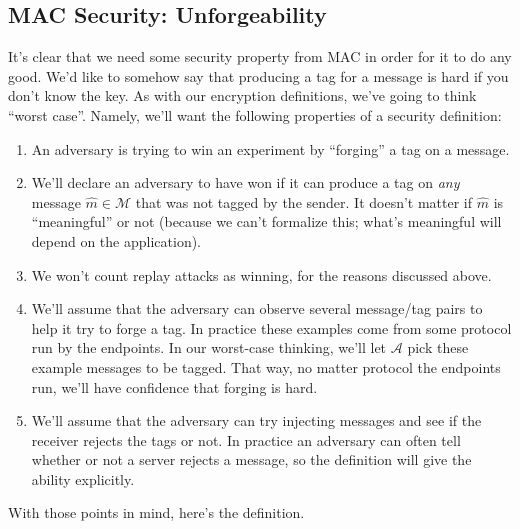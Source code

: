 \documentclass[11pt]{article}
\newcommand{\msgs}{\mathcal{M}}
\newcommand{\calA}{\mathcal{A}}
\newcommand{\hatm}{\hat{m}}
\begin{document}
\subsection{MAC Security: Unforgeability}

It's clear that we need some security property from MAC in order for it
to do any good. We'd like to somehow say that producing a tag for a message
is hard if you don't know the key. As with our encryption definitions, we've
going to think ``worst case''. Namely, we'll want the following properties
of a security definition:
\begin{enumerate}
    \item An adversary is trying to win an experiment by ``forging'' a tag
        on a message.

    \item We'll declare an adversary to have won if it can produce a tag on
        \emph{any} message $\hatm\in\msgs$ that was not tagged by the sender.
        It doesn't matter if $\hatm$ is ``meaningful'' or not (because we
        can't formalize this; what's meaningful will depend on the application).

    \item We won't count replay attacks as winning, for the reasons discussed
        above.

    \item We'll assume that the adversary can observe several message/tag
        pairs to help it try to forge a tag. In practice these examples come
        from some protocol run by the endpoints.
        In our worst-case thinking, we'll let $\calA$ pick these example
        messages to be tagged. That way, no matter protocol the endpoints
        run, we'll have confidence that forging is hard.

    \item We'll assume that the adversary can try injecting messages and see
        if the receiver rejects the tags or not. In practice an adversary
        can often tell whether or not a server rejects a message, so the
        definition will give the ability explicitly.
\end{enumerate}
With those points in mind, here's the definition.
\end{document}
